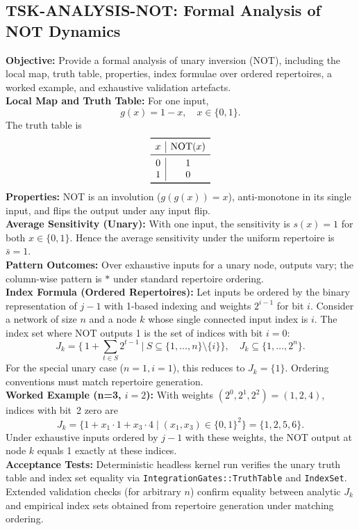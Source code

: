 \documentclass[11pt]{article}
\begin{document}
\subsection{TSK-ANALYSIS-NOT: Formal Analysis of NOT Dynamics}
\textbf{Objective:} Provide a formal analysis of unary inversion (NOT), including the local map, truth table, properties, index formulae over ordered repertoires, a worked example, and exhaustive validation artefacts.\\
\textbf{Local Map and Truth Table:} For one input,
\[
g(x) = 1 - x,\quad x\in\{0,1\}.
\]
The truth table is
\[
\begin{array}{c|c}
\toprule
 x & \mathrm{NOT}(x) \\
\midrule
 0 & 1 \\
 1 & 0 \\
\bottomrule
\end{array}
\]
\textbf{Properties:} NOT is an involution (\(g(g(x))=x\)), anti-monotone in its single input, and flips the output under any input flip.\\
\textbf{Average Sensitivity (Unary):} With one input, the sensitivity is \(s(x)=1\) for both \(x\in\{0,1\}\). Hence the average sensitivity under the uniform repertoire is \(\bar{s}=1\).\\
\textbf{Pattern Outcomes:} Over exhaustive inputs for a unary node, outputs vary; the column-wise pattern is \(*\) under standard repertoire ordering.\\
\textbf{Index Formula (Ordered Repertoires):} Let inputs be ordered by the binary representation of \(j-1\) with 1-based indexing and weights \(2^{i-1}\) for bit \(i\). Consider a network of size \(n\) and a node \(k\) whose single connected input index is \(i\). The index set where \(\mathrm{NOT}\) outputs 1 is the set of indices with bit \(i=0\):
\[
J_k = \Big\{\, 1 + \sum_{t\in S} 2^{t-1} \ \Big| \ S \subseteq \{1,\dots,n\}\setminus\{i\} \Big\},\quad J_k \subseteq \{1,\dots,2^n\}.
\]
For the special unary case (\(n=1, i=1\)), this reduces to \(J_k=\{1\}\). Ordering conventions must match repertoire generation.\\
\textbf{Worked Example (n=3, \(i=2\)):} With weights \((2^{0},2^{1},2^{2})=(1,2,4)\), indices with bit~2 zero are
\[
J_k = \{1 + x_1\cdot 1 + x_3\cdot 4\mid (x_1,x_3)\in\{0,1\}^2\} = \{1,2,5,6\}.
\]
Under exhaustive inputs ordered by \(j-1\) with these weights, the NOT output at node \(k\) equals 1 exactly at these indices.\\
\textbf{Acceptance Tests:} Deterministic headless kernel run verifies the unary truth table and index set equality via \texttt{Integration\textasciigrave Gates::TruthTable} and \texttt{IndexSet}. Extended validation checks (for arbitrary \(n\)) confirm equality between analytic \(J_k\) and empirical index sets obtained from repertoire generation under matching ordering.\\
\end{document}
